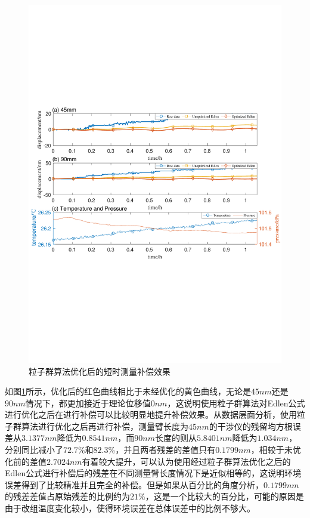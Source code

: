 \begin{figure}[htb]
    \centering
    \includegraphics[width=14cm]{fig/4-fig/edpso_短时测量实验数据.pdf}
    \caption{粒子群算法优化后的短时测量补偿效果}
    \label{fig:粒子群算法优化后的短时测量补偿效果}
\end{figure}

如图\ref{fig:粒子群算法优化后的短时测量补偿效果}所示，优化后的红色曲线相比于未经优化的黄色曲线，无论是$45nm$还是$90nm$情况下，都更加接近于理论位移值$0nm$，这说明使用粒子群算法对Edlen公式进行优化之后在进行补偿可以比较明显地提升补偿效果。从数据层面分析，使用粒子群算法进行优化之后再进行补偿，测量臂长度为$45nm$的干涉仪的残留均方根误差从$3.1377nm$降低为$0.8541nm$，而$90nm$长度的则从$5.8401nm$降低为$1.034nm$，分别同比减小了$72.7\%$和$82.3\%$，并且两者残差的差值只有$0.1799nm$，相较于未优化前的差值$2.7024nm$有着较大提升，可以认为使用经过粒子群算法优化之后的Edlen公式进行补偿后的残差在不同测量臂长度情况下是近似相等的，这说明环境误差得到了比较精准并且完全的补偿。但是如果从百分比的角度分析，$0.1799nm$的残差差值占原始残差的比例约为$21\%$，这是一个比较大的百分比，可能的原因是由于改组温度变化较小，使得环境误差在总体误差中的比例不够大。

